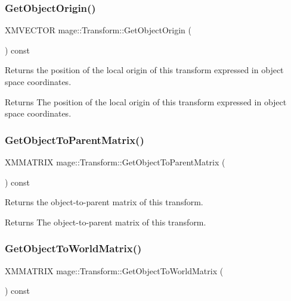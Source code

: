 \subsubsection{\texorpdfstring{Get\+Object\+Origin()}{GetObjectOrigin()}}
{\footnotesize\ttfamily X\+M\+V\+E\+C\+T\+OR mage\+::\+Transform\+::\+Get\+Object\+Origin (\begin{DoxyParamCaption}{ }\end{DoxyParamCaption}) const}

Returns the position of the local origin of this transform expressed in object space coordinates.

\begin{DoxyReturn}{Returns}
The position of the local origin of this transform expressed in object space coordinates. 
\end{DoxyReturn}
\hypertarget{structmage_1_1_transform_a8da2bed8599b4f012ac85af9d76c7f37}{}\label{structmage_1_1_transform_a8da2bed8599b4f012ac85af9d76c7f37} 
\subsubsection{\texorpdfstring{Get\+Object\+To\+Parent\+Matrix()}{GetObjectToParentMatrix()}}
{\footnotesize\ttfamily X\+M\+M\+A\+T\+R\+IX mage\+::\+Transform\+::\+Get\+Object\+To\+Parent\+Matrix (\begin{DoxyParamCaption}{ }\end{DoxyParamCaption}) const}

Returns the object-\/to-\/parent matrix of this transform.

\begin{DoxyReturn}{Returns}
The object-\/to-\/parent matrix of this transform. 
\end{DoxyReturn}
\hypertarget{structmage_1_1_transform_a6fe97738bf9ae9d1e677c3e09b8c6d81}{}\label{structmage_1_1_transform_a6fe97738bf9ae9d1e677c3e09b8c6d81} 
\subsubsection{\texorpdfstring{Get\+Object\+To\+World\+Matrix()}{GetObjectToWorldMatrix()}}
{\footnotesize\ttfamily X\+M\+M\+A\+T\+R\+IX mage\+::\+Transform\+::\+Get\+Object\+To\+World\+Matrix (\begin{DoxyParamCaption}{ }\end{DoxyParamCaption}) const}

